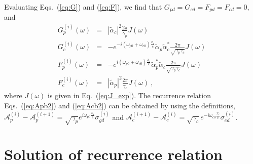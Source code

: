 \documentclass[aps, pra, reprint, amsmath, amssymb, groupedaddress, acknowledgments]{revtex4-1}
\begin{document}
Evaluating Eqs.~(\ref{eq:G}) and (\ref{eq:F}), we find that $G_{pd}=G_{cd}=F_{pd}=F_{cd}=0$, and
\begin{eqnarray}
G_p^{(i)}(\omega) &=&|\tilde{\alpha}_c|^2 \frac{2\pi}{\gamma_p}J(\omega) \\
G_c^{(i)}(\omega) &=& -e^{-i(\omega_{p0}+\omega_{c0})\frac{x_i}{c}} \tilde{\alpha}_p \tilde{\alpha}_c^\ast \frac{2\pi}{\sqrt{\gamma_p\gamma_c}} J(\omega)  \\
F_p^{(i)}(\omega) &=& -e^{i(\omega_{p0}+\omega_{c0})\frac{x_i}{c}} \tilde{\alpha}_p^\ast \tilde{\alpha}_c \frac{2\pi}{\sqrt{\gamma_p\gamma_c}} J(\omega)  \\
F_c^{(i)}(\omega) &=&|\tilde{\alpha}_p|^2 \frac{2\pi}{\gamma_c}J(\omega)~,
\end{eqnarray}
where $J(\omega)$ is given in Eq.~(\ref{eq:J_exp}).  The recurrence relation Eqs.~(\ref{eq:Apb2}) and (\ref{eq:Acb2}) can be obtained by using the definitions, $ \mathcal{A}_p^{(i)}  -  \mathcal{A}_p^{(i+1)}  = \sqrt{\gamma_p} e^{i \omega_{p0}\frac{x_i}{c}} \sigma_{gd}^{(i)}$ and $ \mathcal{A}_c^{(i+1)}  -  \mathcal{A}_c^{(i)} = \sqrt{\gamma_c} e^{-i \omega_{c0}\frac{x_i}{c}} \sigma_{ed}^{(i)} $.

\section{Solution of recurrence relation \label{app:solution}}
\end{document}
